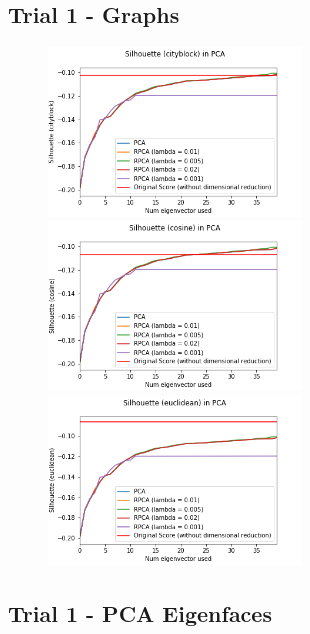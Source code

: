 \documentclass[11pt]{scrartcl} %
\theoremstyle{plain}
\begin{document}
\subsection{Trial 1 - Graphs}

\begin{figure}[H]
\centering
\includegraphics[width=0.6\textwidth]{figures/rpcatrial1cityblock.png}\\
\includegraphics[width=0.6\textwidth]{figures/rpcatrial1cosine.png}\\
\includegraphics[width=0.6\textwidth]{figures/rpcatrial1euclidean.png}\\
\end{figure}

\subsection{Trial 1 - PCA Eigenfaces}
\end{document}
